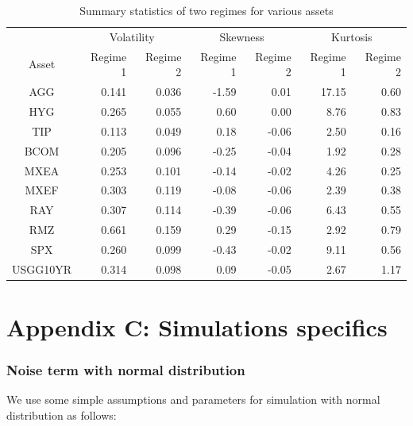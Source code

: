 \documentclass[11pt]{article}
\begin{document}
\begin{table}
\caption{Summary statistics of two regimes for various assets} 
\centering 
\begin{tabular}{ | c || rr | rr | rr | } 
 \hline
& \multicolumn{2}{c|}{Volatility} & \multicolumn{2}{c|}{Skewness} & \multicolumn{2}{c|}{Kurtosis} \\
Asset & Regime 1 & Regime 2 & Regime 1 & Regime 2 & Regime 1 & Regime 2 \\
  \hline \hline
AGG & 0.141 & 0.036 & -1.59 &  0.01 & 17.15 &  0.60\\ 
HYG & 0.265 & 0.055 &  0.60 &  0.00 &  8.76 &  0.83\\ 
TIP & 0.113 & 0.049 &  0.18 & -0.06 &  2.50 &  0.16\\ 
BCOM & 0.205 & 0.096 & -0.25 & -0.04 &  1.92 &  0.28\\ 
MXEA & 0.253 & 0.101 & -0.14 & -0.02 &  4.26 &  0.25\\ 
MXEF & 0.303 & 0.119 & -0.08 & -0.06 &  2.39 &  0.38\\ 
RAY & 0.307 & 0.114 & -0.39 & -0.06 &  6.43 &  0.55\\ 
RMZ & 0.661 & 0.159 &  0.29 & -0.15 &  2.92 &  0.79\\ 
SPX & 0.260 & 0.099 & -0.43 & -0.02 &  9.11 &  0.56\\ 
USGG10YR & 0.314 & 0.098 &  0.09 & -0.05 &  2.67 &  1.17 \\
 \hline
\end{tabular}
\label{table:statSumRegime}
\end{table}

\section{Appendix C: Simulations specifics} \label{App:AppendixC}
\subsubsection{Noise term with normal distribution}

We use some simple assumptions and parameters for simulation with normal distribution as follows:
\end{document}
